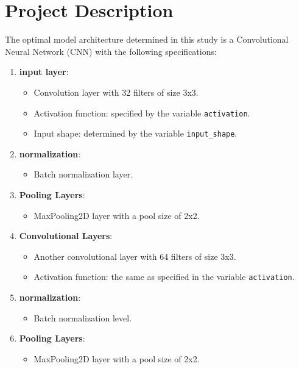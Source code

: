 \documentclass{article}
\begin{document}
\newpage
\section{Project Description}

The optimal model architecture determined in this study is a Convolutional Neural Network (CNN) with the following specifications:

\begin{enumerate}
    \item \textbf{input layer}:
          \begin{itemize}
              \item Convolution layer with 32 filters of size 3x3.
              \item Activation function: specified by the variable \texttt{activation}.
              \item Input shape: determined by the variable \texttt{input\_shape}.
          \end{itemize}

    \item \textbf{normalization}:
          \begin{itemize}
              \item Batch normalization layer.
          \end{itemize}

    \item \textbf{Pooling Layers}:
          \begin{itemize}
              \item MaxPooling2D layer with a pool size of 2x2.
          \end{itemize}

    \item \textbf{Convolutional Layers}:
          \begin{itemize}
              \item Another convolutional layer with 64 filters of size 3x3.
              \item Activation function: the same as specified in the variable \texttt{activation}.
          \end{itemize}

    \item \textbf{normalization}:
          \begin{itemize}
              \item Batch normalization level.
          \end{itemize}

    \item \textbf{Pooling Layers}:
          \begin{itemize}
              \item MaxPooling2D layer with a pool size of 2x2.
          \end{itemize}


\end{enumerate}
\end{document}
